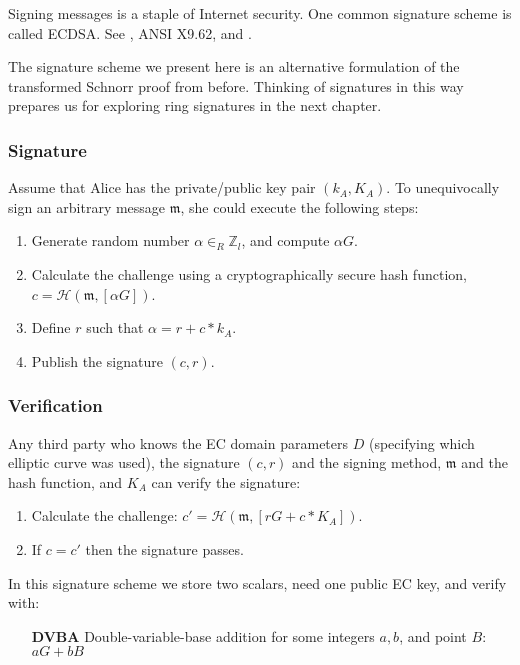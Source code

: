 Signing messages is a staple of Internet security. One common signature scheme is called ECDSA. See \cite{ecdsa}, ANSI X9.62, and \cite{Hankerson:2003:GEC:940321}.

The signature scheme we present here is an alternative formulation of the transformed Schnorr proof from before. Thinking of signatures in this way prepares us for exploring ring signatures in the next chapter.


\subsubsection*{Signature}

Assume that Alice has the private/public key pair \((k_A, K_A)\). To unequivocally sign an arbitrary message $\mathfrak{m}$, she could execute the following steps:

\begin{enumerate}
	\item Generate random number $\alpha \in_R \mathbb{Z}_l$, and compute $\alpha G$.
	\item Calculate the challenge using a cryptographically secure hash function, \(c = \mathcal{H}(\mathfrak{m},[\alpha G])\).
	\item Define $r$ such that $\alpha = r + c*k_A$.
	\item Publish the signature $(c, r)$.
\end{enumerate}


\subsubsection*{Verification}

Any third party who knows the EC domain parameters $D$ (specifying which elliptic curve was used), the signature $(c, r)$ and the signing method, $\mathfrak{m}$ and the hash function, and $K_A$ can verify the signature:

\begin{enumerate}
	\item Calculate the challenge: \(c' = \mathcal{H}(\mathfrak{m},[r G + c*K_A])\).
	\item If $c = c'$ then the signature passes.
\end{enumerate}

In this signature scheme we store two scalars, need one public EC key, and verify with:

\begin{itemize}
    \setlength\itemsep{\listspace}
    \item [\textbf{DVBA}] Double-variable-base addition for some integers $a, b$, and point $B$: $a G + b B$ \quad [1]
\end{itemize}


